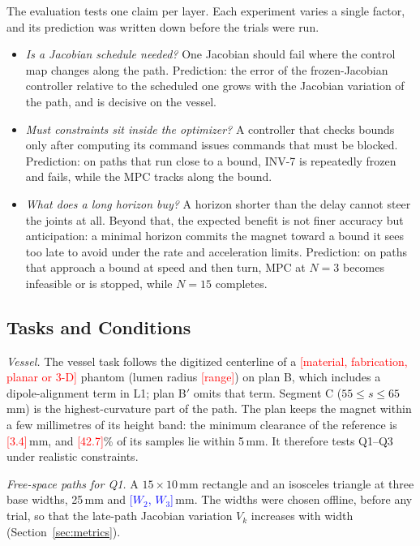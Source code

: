 \documentclass[journal]{IEEEtran}
\newcommand{\TBD}[1]{\textcolor{red}{[#1]}}
\newcommand{\NEWRUN}[1]{\textcolor{blue}{[#1]}}
\begin{document}
The evaluation tests one claim per layer. Each experiment varies a single
factor, and its prediction was written down before the trials were run.
\begin{itemize}
\item[Q1] \emph{Is a Jacobian schedule needed?} One Jacobian should fail
where the control map changes along the path. Prediction: the error of
the frozen-Jacobian controller relative to the scheduled one grows with
the Jacobian variation of the path, and is decisive on the vessel.
\item[Q2] \emph{Must constraints sit inside the optimizer?} A controller
that checks bounds only after computing its command issues commands that
must be blocked. Prediction: on paths that run close to a bound, INV-7 is
repeatedly frozen and fails, while the MPC tracks along the bound.
\item[Q3] \emph{What does a long horizon buy?} A horizon shorter than the
delay cannot steer the joints at all. Beyond that, the expected benefit
is not finer accuracy but anticipation: a minimal horizon commits the
magnet toward a bound it sees too late to avoid under the rate and
acceleration limits. Prediction: on paths that approach a bound at speed
and then turn, MPC at $N=3$ becomes infeasible or is stopped, while
$N=15$ completes.
\end{itemize}

\subsection{Tasks and Conditions}
\label{sec:tasks}

\emph{Vessel.} The vessel task follows the digitized centerline of a
\TBD{material, fabrication, planar or 3-D} phantom (lumen radius
\TBD{range}) on plan B, which includes a dipole-alignment term in L1; plan
B$'$ omits that term. %
Segment C ($55\le s\le65$\,mm) is the highest-curvature part of the path.
The plan keeps the magnet within a few millimetres of its height band:
the minimum clearance of the reference is \TBD{3.4}\,mm, and \TBD{42.7}\% of its
samples lie within 5\,mm. It therefore tests Q1--Q3 under realistic
constraints.

\emph{Free-space paths for Q1.} A $15\times10$\,mm rectangle and an
isosceles triangle at three base widths, 25\,mm and \NEWRUN{$W_2$,
$W_3$}\,mm. The widths were chosen offline, before any trial, so that the
late-path Jacobian variation $V_k$ increases with width
(Section~\ref{sec:metrics}).
\end{document}
